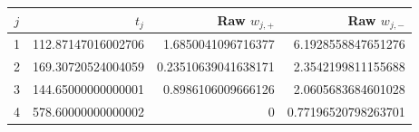 \begin{tabular}{crrr}\toprule
$j$ & $t_j$ & Raw $w_{j,+}$ & Raw $w_{j,-}$\\\midrule
1 & 112.87147016002706 & 1.6850041096716377 & 6.1928558847651276 \\
2 & 169.30720524004059 & 0.23510639041638171 & 2.3542199811155688 \\
3 & 144.65000000000001 & 0.8986106009666126 & 2.0605683684601028 \\
4 & 578.60000000000002 & 0 & 0.77196520798263701 \\
\bottomrule\end{tabular}
